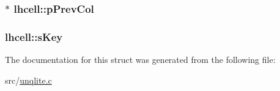 \hypertarget{structlhcell_acb148f7309e5784935cedefa38daed98}{
\subsubsection[{p\-Prev\-Col}]{ $\ast$ lhcell\-::p\-Prev\-Col}}\label{d1/da5/structlhcell_acb148f7309e5784935cedefa38daed98}
\hypertarget{structlhcell_a3b40873c9242c1f2e24ce63b9a1fb5a7}{
\subsubsection[{s\-Key}]{ lhcell\-::s\-Key}}\label{d1/da5/structlhcell_a3b40873c9242c1f2e24ce63b9a1fb5a7}


The documentation for this struct was generated from the following file\-:\begin{DoxyCompactItemize}
\item 
src/\hyperlink{unqlite_8c}{unqlite.\-c}\end{DoxyCompactItemize}
